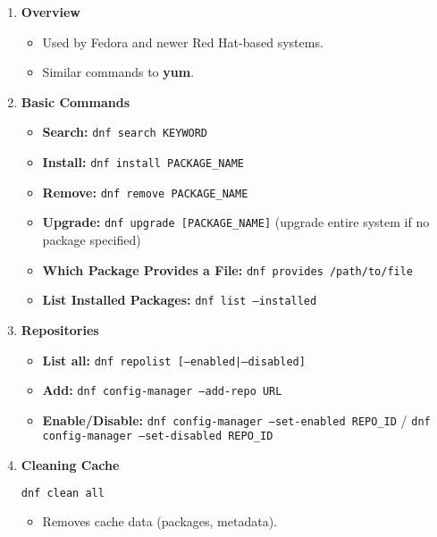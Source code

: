 \documentclass[12pt,a4paper]{report}
\begin{document}
\begin{enumerate}
    \item \textbf{Overview}
    \begin{itemize}
        \item Used by Fedora and newer Red Hat-based systems.
        \item Similar commands to \textbf{yum}.
    \end{itemize}

    \item \textbf{Basic Commands}
    \begin{itemize}
        \item \textbf{Search:} \texttt{dnf search KEYWORD}
        \item \textbf{Install:} \texttt{dnf install PACKAGE\_NAME}
        \item \textbf{Remove:} \texttt{dnf remove PACKAGE\_NAME}
        \item \textbf{Upgrade:} \texttt{dnf upgrade [PACKAGE\_NAME]} (upgrade entire system if no package specified)
        \item \textbf{Which Package Provides a File:} \texttt{dnf provides /path/to/file}
        \item \textbf{List Installed Packages:} \texttt{dnf list --installed}
    \end{itemize}

    \item \textbf{Repositories}
    \begin{itemize}
        \item \textbf{List all:} \texttt{dnf repolist [--enabled|--disabled]}
        \item \textbf{Add:} \texttt{dnf config-manager --add-repo URL}
        \item \textbf{Enable/Disable:} \texttt{dnf config-manager --set-enabled REPO\_ID} / \texttt{dnf config-manager --set-disabled REPO\_ID}
    \end{itemize}

    \item \textbf{Cleaning Cache}
    \begin{lstlisting}[language=bash]
dnf clean all
    \end{lstlisting}
    \begin{itemize}
        \item Removes cache data (packages, metadata).
    \end{itemize}
\end{enumerate}
\end{document}
